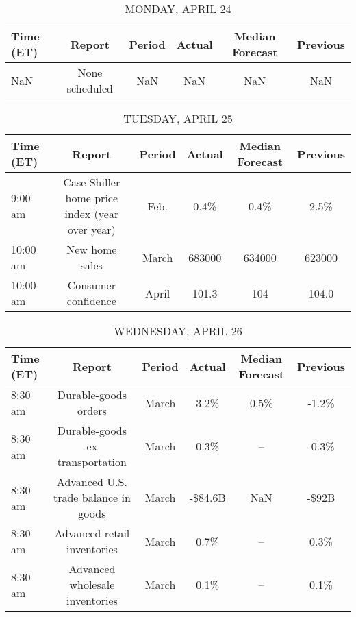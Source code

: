 \documentclass{article}%
\begin{document}
%
\normalsize%


\begin{table}[htbp]%
\caption{MONDAY, APRIL 24}%
\centering%
\begin{adjustbox}{width=1\textwidth}%
\begin{tabular}{lccccc}
\toprule
Time (ET) &         Report & Period & Actual & Median Forecast & Previous \\
\midrule
      NaN & None scheduled &    NaN &    NaN &             NaN &      NaN \\
\bottomrule
\end{tabular}
%
\end{adjustbox}%
\end{table}

%


\begin{table}[htbp]%
\caption{TUESDAY, APRIL 25}%
\centering%
\begin{adjustbox}{width=1\textwidth}%
\begin{tabular}{lccccc}
\toprule
Time (ET) &                                         Report & Period & Actual & Median Forecast & Previous \\
\midrule
  9:00 am & Case-Shiller home price index (year over year) &   Feb. &   0.4\% &            0.4\% &     2.5\% \\
 10:00 am &                                 New home sales &  March & 683000 &          634000 &   623000 \\
 10:00 am &                            Consumer confidence &  April &  101.3 &             104 &    104.0 \\
\bottomrule
\end{tabular}
%
\end{adjustbox}%
\end{table}

%


\begin{table}[htbp]%
\caption{WEDNESDAY, APRIL 26}%
\centering%
\begin{adjustbox}{width=1\textwidth}%
\begin{tabular}{lccccc}
\toprule
Time (ET) &                               Report & Period &  Actual & Median Forecast & Previous \\
\midrule
  8:30 am &                 Durable-goods orders &  March &    3.2\% &            0.5\% &    -1.2\% \\
  8:30 am &      Durable-goods ex transportation &  March &    0.3\% &              -- &    -0.3\% \\
  8:30 am & Advanced U.S. trade balance in goods &  March & -\$84.6B &             NaN &    -\$92B \\
  8:30 am &          Advanced retail inventories &  March &    0.7\% &              -- &     0.3\% \\
  8:30 am &       Advanced wholesale inventories &  March &    0.1\% &              -- &     0.1\% \\
\bottomrule
\end{tabular}
%
\end{adjustbox}%
\end{table}
\end{document}

